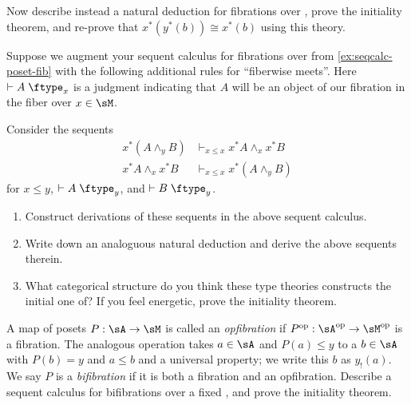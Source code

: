 \documentclass{book}
\let\types\vdash
\def\type{\;\ftype}
\let\meet\wedge
\begin{document}
\begin{ex}\label{ex:natded-poset-fib}
  Now describe instead a natural deduction for fibrations over \sM, prove the initiality theorem, and re-prove that $x^*(y^*(b))\cong x^*(b)$ using this theory.
\end{ex}

\begin{ex}\label{ex:mslat-fib}
  Suppose we augment your sequent calculus for fibrations over \sM from \cref{ex:seqcalc-poset-fib} with the following additional rules for ``fiberwise meets''.
  Here $\types A\type_x$ is a judgment indicating that $A$ will be an object of our fibration in the fiber over $x\in\sM$.
  Consider the sequents
  \begin{align*}
    x^*(A\meet_y B) &\types_{x\le x} x^*A \meet_x x^*B\\
    x^*A \meet_x x^*B &\types_{x\le x} x^*(A\meet_y B)
  \end{align*}
  for $x\le y$, $\types A\type_y$, and $\types B\type_y$.
  \begin{enumerate}
  \item Construct derivations of these sequents in the above sequent calculus.
  \item Write down an analoguous natural deduction and derive the above sequents therein.
  \item What categorical structure do you think these type theories constructs the initial one of?
    If you feel energetic, prove the initiality theorem.
  \end{enumerate}
\end{ex}

\begin{ex}\label{ex:poset-bifib}
  A map of posets $P:\sA\to\sM$ is called an \emph{opfibration} if $P\op:\sA\op\to\sM\op$ is a fibration.
  The analogous operation takes $a\in \sA$ and $P(a)\le y$ to a $b\in \sA$ with $P(b)=y$ and $a\le b$ and a universal property; we write this $b$ as $y_!(a)$.
  We say $P$ is a \emph{bifibration} if it is both a fibration and an opfibration.
  Describe a sequent calculus for bifibrations over a fixed \sM, and prove the initiality theorem.
\end{ex}
\end{document}
